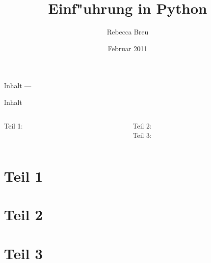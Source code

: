 \documentclass{beamer}
\title{Einf"uhrung in Python}
\date{Februar 2011}
\author{Rebecca Breu}
\institute
{
 Verteilte Systeme und Grid-Computing \\
 JSC\\
 Forschungszentrum J"ulich
}
\begin{document}
\AtBeginPart
{
  \begin{frame}
  \titlepage
  \end{frame}

  \begin{frame}{Inhalt --- \insertpart}
  \tableofcontents
  \end{frame}
}


\AtBeginSection[]
{
   \begin{frame}{\insertsection}
       \tableofcontents[currentsection]
   \end{frame}
}


\begin{frame}
\titlepage
\end{frame}

\begin{frame}{Inhalt}
\begin{columns}[t]

\begin{column}{0.4\textwidth}
  Teil 1:\\[3mm]
  \tableofcontents[part=1]
\end{column}

\begin{column}{0.6\textwidth}
  Teil 2:\\[3mm]
  \tableofcontents[part=2]
  \vspace{7mm}
  Teil 3:\\[3mm]
  \tableofcontents[part=3]
\end{column}

\end{columns}
\end{frame}


\part{Teil 1}









\vielspass

\part{Teil 2}





\vielspass

\part{Teil 3}





\vielspass
\end{document}
